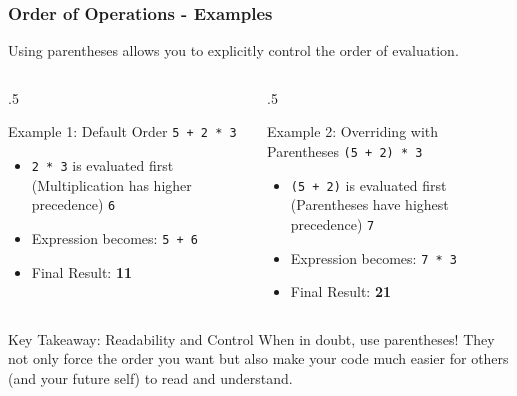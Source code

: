 \documentclass{beamer}
\begin{document}
\begin{frame}[fragile]
    \frametitle{Order of Operations - Examples}
    
    Using parentheses allows you to explicitly control the order of evaluation.
    
    \begin{columns}[T] %
        \begin{column}{.5\textwidth}
            \begin{block}{Example 1: Default Order}
                \texttt{5 + 2 * 3}
                \begin{itemize}
                    \item \texttt{2 * 3} is evaluated first (Multiplication has higher precedence) \rightarrow \texttt{6}
                    \item Expression becomes: \texttt{5 + 6}
                    \item Final Result: \textbf{11}
                \end{itemize}
            \end{block}
        \end{column}
        
        \begin{column}{.5\textwidth}
            \begin{block}{Example 2: Overriding with Parentheses}
                \texttt{(5 + 2) * 3}
                \begin{itemize}
                    \item \texttt{(5 + 2)} is evaluated first (Parentheses have highest precedence) \rightarrow \texttt{7}
                    \item Expression becomes: \texttt{7 * 3}
                    \item Final Result: \textbf{21}
                \end{itemize}
            \end{block}
        \end{column}
    \end{columns}
    
    \vspace{1em}
    
    \begin{alertblock}{Key Takeaway: Readability and Control}
        When in doubt, use parentheses! They not only force the order you want but also make your code much easier for others (and your future self) to read and understand.
    \end{alertblock}
\end{frame}
\end{document}

